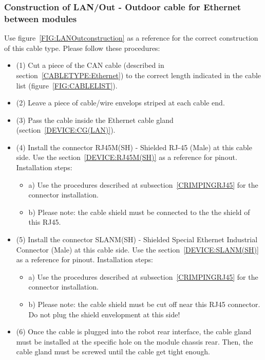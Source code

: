 \subsubsection{Construction of LAN/Out - Outdoor cable for Ethernet between modules} \label{CONSTRUCTION:LANOut}
Use figure~\ref{FIG:LANOutconstruction} as a reference for the correct construction of this cable type. Please follow these procedures:
\begin{itemize}
  \item (1) Cut a piece of the CAN cable (described in section~\ref{CABLETYPE:Ethernet}) to the correct length indicated in the cable list (figure~\ref{FIG:CABLELIST}).
  \item (2) Leave a piece of cable/wire envelops striped at each cable end.
  \item (3) Pass the cable inside the Ethernet cable gland (section~\ref{DEVICE:CG(LAN)}).
  \item (4) Install the connector RJ45M(SH) - Shielded RJ-45 (Male) at this cable side. Use the section~\ref{DEVICE:RJ45M(SH)} as a reference for pinout. Installation steps:
  \begin{itemize}
    \item a) Use the procedures described at subsection~\ref{CRIMPINGRJ45} for the connector installation.
    \item b) Please note: the cable shield must be connected to the the shield of this RJ45.
  \end{itemize}
  \item (5) Install the connector SLANM(SH) - Shielded Special Ethernet Industrial Connector (Male) at this cable side. Use the section~\ref{DEVICE:SLANM(SH)} as a reference for pinout. Installation steps:
  \begin{itemize}
    \item a) Use the procedures described at subsection~\ref{CRIMPINGRJ45} for the connector installation.
    \item b) Please note: the cable shield must be cut off near this RJ45 connector. Do not plug the shield envelopment at this side!
  \end{itemize}
  \item (6) Once the cable is plugged into the robot rear interface, the cable gland must be installed at the specific hole on the module chassis rear. Then, the cable gland must be screwed until the cable get tight enough.
\end{itemize}
